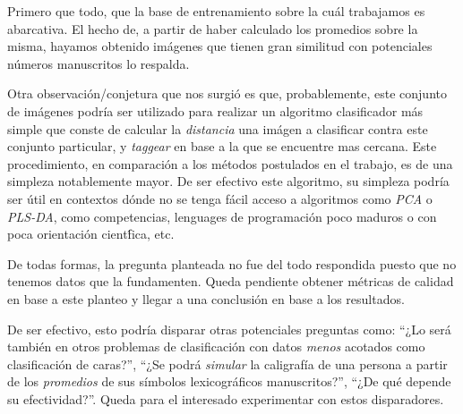 Primero que todo, que la base de entrenamiento sobre la cu\'al trabajamos es abarcativa. El hecho de, a partir de haber calculado los promedios sobre la misma, hayamos obtenido im\'agenes que tienen gran similitud con potenciales n\'umeros manuscritos lo respalda.

Otra observaci\'on/conjetura que nos surgi\'o es que, probablemente, este conjunto de im\'agenes podr\'ia ser utilizado para realizar un algoritmo clasificador m\'as simple que conste de calcular la \textit{distancia} una im\'agen a clasificar contra este conjunto particular, y \textit{taggear} en base a la que se encuentre mas cercana. Este procedimiento, en comparaci\'on a los m\'etodos postulados en el trabajo, es de una simpleza notablemente mayor. De ser efectivo este algoritmo, su simpleza podr\'ia ser \'util en contextos d\'onde no se tenga f\'acil acceso a algoritmos como \textit{PCA} o \textit{PLS-DA}, como competencias, lenguages de programaci\'on poco maduros o con poca orientaci\'on cient\'fica, etc.

De todas formas, la pregunta planteada no fue del todo respondida puesto que no tenemos datos que la fundamenten. Queda pendiente obtener m\'etricas de calidad en base a este planteo y llegar a una conclusi\'on en base a los resultados.

De ser efectivo, esto podr\'ia disparar otras potenciales preguntas como: ``¿Lo ser\'a tambi\'en en otros problemas de clasificaci\'on con datos \textit{menos} acotados como clasificaci\'on de caras?'', ``¿Se podr\'a \textit{simular} la caligraf\'ia de una persona a partir de los \textit{promedios} de sus s\'imbolos lexicogr\'aficos manuscritos?'', ``¿De qu\'e depende su efectividad?''. Queda para el interesado experimentar con estos disparadores.

